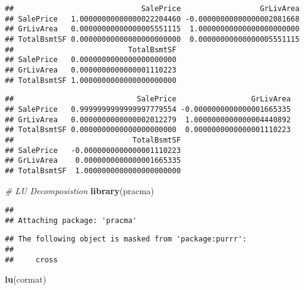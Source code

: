 \documentclass[]{article}
\newenvironment{Shaded}{\begin{snugshade}}{\end{snugshade}}
\newcommand{\CommentTok}[1]{\textcolor[rgb]{0.56,0.35,0.01}{\textit{#1}}}
\newcommand{\KeywordTok}[1]{\textcolor[rgb]{0.13,0.29,0.53}{\textbf{#1}}}
\newcommand{\NormalTok}[1]{#1}
\newcommand{\OperatorTok}[1]{\textcolor[rgb]{0.81,0.36,0.00}{\textbf{#1}}}
\newcommand{\StringTok}[1]{\textcolor[rgb]{0.31,0.60,0.02}{#1}}
\begin{document}
\begin{verbatim}
##                             SalePrice                  GrLivArea
## SalePrice   1.00000000000000022204460 -0.00000000000000002081668
## GrLivArea   0.00000000000000005551115  1.00000000000000000000000
## TotalBsmtSF 0.00000000000000000000000  0.00000000000000005551115
##                          TotalBsmtSF
## SalePrice   0.0000000000000000000000
## GrLivArea   0.0000000000000001110223
## TotalBsmtSF 1.0000000000000000000000
\end{verbatim}

\begin{Shaded}
\end{Shaded}

\begin{verbatim}
##                            SalePrice                 GrLivArea
## SalePrice   0.9999999999999997779554 -0.0000000000000001665335
## GrLivArea   0.0000000000000002012279  1.0000000000000004440892
## TotalBsmtSF 0.0000000000000000000000  0.0000000000000001110223
##                           TotalBsmtSF
## SalePrice   -0.0000000000000001110223
## GrLivArea    0.0000000000000001665335
## TotalBsmtSF  1.0000000000000000000000
\end{verbatim}

\begin{Shaded}
\begin{Highlighting}[]
\CommentTok{# LU Decomposistion}
\KeywordTok{library}\NormalTok{(pracma)}
\end{Highlighting}
\end{Shaded}

\begin{verbatim}
## 
## Attaching package: 'pracma'
\end{verbatim}

\begin{verbatim}
## The following object is masked from 'package:purrr':
## 
##     cross
\end{verbatim}

\begin{Shaded}
\begin{Highlighting}[]
\KeywordTok{lu}\NormalTok{(cormat)}
\end{Highlighting}
\end{Shaded}
\end{document}
